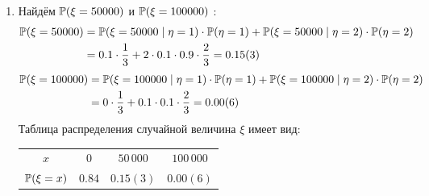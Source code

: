\begin{enumerate}
\begin{enumerate}
\item Найдём $\P (\xi = 50000 )$ и $\P (\xi = 100000 )$ :
\begin{align*}
\P (\xi = 50000 ) &= \P (\xi = 50000 \mid \eta = 1 ) \cdot \P ( \eta = 1  ) +  \P (\xi = 50000 \mid \eta = 2 ) \cdot  \P ( \eta = 2 ) \\
&= 0.1 \cdot \frac{1}{3} + 2 \cdot 0.1 \cdot 0.9 \cdot \frac{2}{3} = 0.15(3)
\end{align*}
\begin{align*}
\P (\xi = 100000 ) &=  \P (\xi = 100000 \mid \eta = 1 ) \cdot \P ( \eta = 1 ) +  \P (\xi = 100000 \mid \eta = 2 ) \cdot  \P ( \eta = 2  ) \\
&= 0 \cdot \frac{1}{3} + 0.1\cdot 0.1  \cdot \frac{2}{3} = 0.00(6)
\end{align*}
Таблица распределения случайной величина $\xi$ имеет вид:

\begin{center}
\begin{tabular}{cccc}
\toprule
$x$ & $ 0 $ & $50\,000$ & $100\,000$ \\
$\P(\xi = x)$ & $0.84$ & $0.15(3)$ & $0.00(6)$ \\ \bottomrule
\end{tabular}
\end{center}


\end{enumerate}
\end{enumerate}

